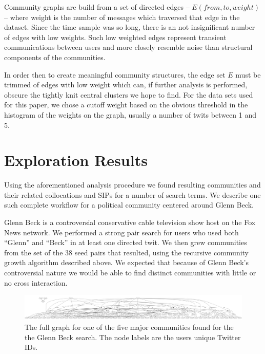 \documentclass[10pt,oneside]{memoir}
\begin{document}
\begin{Spacing}{2}
Community graphs are build from a set of directed edges --
$E(from,to,weight)$ -- where weight is the number of messages which
traversed that edge in the dataset. Since the time sample was so
long, there is an not insignificant number of edges with low
weights. Such low weighted edges represent transient communications
between users and more closely resemble noise than structural
components of the communities.


In order then to create meaningful community structures, the edge
set $E$ must be trimmed of edges with low weight which can, if
further analysis is performed, obscure the tightly knit central
clusters we hope to find. For the data sets used for this paper, we
chose a cutoff weight based on the obvious threshold in the
histogram of the weights on the graph, usually a number of twits
between 1 and 5.


\pagebreak \section{Exploration Results}
\label{explorationresults}

Using the aforementioned analysis procedure we found resulting communities and their related collocations and SIPs for a number of search terms.  We describe one such complete workflow for a political community centered around Glenn Beck.


Glenn Beck is a controversial conservative cable television show host on the Fox News network.  We performed a strong pair search for users who used both ``Glenn'' and ``Beck'' in at least one directed twit.  We then grew communities from the set of the 38 seed pairs that resulted, using the recursive community growth algorithm described above.  We expected that because of Glenn Beck's controversial nature we would be able to find distinct communities with little or no cross interaction.



\begin{figure}
\begin{center}
\includegraphics[width=6in]{figures/gb5}
\caption{The full graph for one of the five major communities found for the the Glenn Beck search.  The node labels are the users unique Twitter IDs.}
\label{figure:gb-full}
\end{center}
\end{figure}


\end{Spacing}
\end{document}

